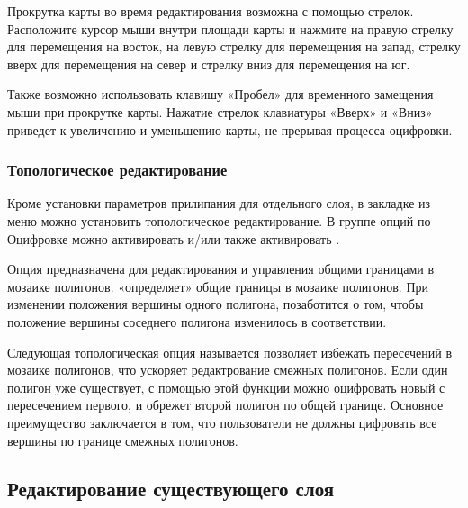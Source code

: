 
Прокрутка карты во время редактирования возможна с помощью стрелок. Расположите
курсор мыши внутри площади карты и нажмите на правую стрелку для перемещения на
восток, на левую стрелку для перемещения на запад, стрелку вверх для перемещения на
север и стрелку вниз для перемещения на юг.

Также возможно использовать клавишу «Пробел» для временного замещения мыши при
прокрутке карты. Нажатие стрелок клавиатуры «Вверх» и «Вниз» приведет к
увеличению и уменьшению карты, не прерывая процесса оцифровки.

\subsubsection{Топологическое редактирование}

Кроме установки параметров прилипания для отдельного слоя, в закладке 
из меню
 \arrow {}
можно установить топологическое редактирование. В группе опций по Оцифровке
можно активировать  и/или
также активировать .


Опция  предназначена для
редактирования и управления общими границами в мозаике полигонов. \qg
«определяет» общие границы в мозаике полигонов. При изменении положения
вершины одного полигона, \qg позаботится о том, чтобы положение вершины
соседнего полигона изменилось в соответствии.


Следующая топологическая опция называется  позволяет избежать пересечений в мозаике полигонов, что
ускоряет редактрование смежных полигонов. Если один полигон уже существует,
с помощью этой функции можно оцифровать новый с пересечением первого, и
\qg обрежет второй полигон по общей границе. Основное преимущество заключается
в том, что пользователи не должны цифровать все вершины по границе смежных
полигонов.

\subsection{Редактирование существующего слоя}
\label{sec:edit_existing_layer}

